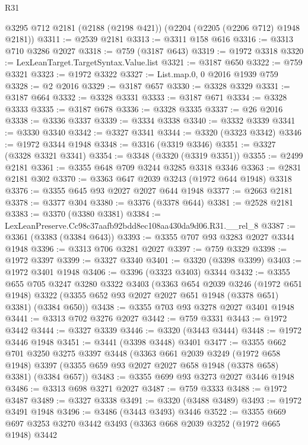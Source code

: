 \begin{lexlean}{R31}
\begin{coremodule}
    @3295
    @712
    @2181
    (@2188 (@2198 @421))
    (@2204 (@2205 (@2206 @712) @1948 @2181))
@3311 := @2539 @2181
@3313 := @3311 @158 @616
@3316 := @3313 @710 @3286 @2027
@3318 := @759 (@3187 @643)
@3319 := @1972 @3318
@3320 := LexLeanTarget.TargetSyntax.Value.list
@3321 := @3187 @650
@3322 := @759 @3321
@3323 := @1972 @3322
@3327 := List.map.{0, 0} @2016 @1939 @759
@3328 := @2 @2016
@3329 := @3187 @657
@3330 := @3328 @3329
@3331 := @3187 @664
@3332 := @3328 @3331
@3333 := @3187 @671
@3334 := @3328 @3333
@3335 := @3187 @678
@3336 := @3328 @3335
@3337 := @26 @2016
@3338 := @3336 @3337
@3339 := @3334 @3338
@3340 := @3332 @3339
@3341 := @3330 @3340
@3342 := @3327 @3341
@3344 := @3320 (@3323 @3342)
@3346 := @1972 @3344 @1948
@3348 := @3316 (@3319 @3346)
@3351 := @3327 (@3328 @3321 @3341)
@3354 := @3348 (@3320 (@3319 @3351))
@3355 := @2499 @2181
@3361 := @3355 @648 @709 @3244 @3285 @3318 @3346
@3363 := @2831 @2181 @302
@3370 := @3363 @647 @2039 @3243 (@1972 @644 @1948) @3318
@3376 := @3355 @645 @93 @2027 @2027 @644 @1948
@3377 := @2663 @2181
@3378 := @3377 @304
@3380 := @3376 (@3378 @644)
@3381 := @2528 @2181
@3383 := @3370 (@3380 @3381)
@3384 := LexLeanPreserve.Cc98c37aafb92bdd8ec108aa430da9d06.R31.__rel_8
@3387 := @3361 (@3383 (@3384 @643))
@3393 := @3355 @707 @93 @3283 @2027 @3344 @1948
@3396 := @3313 @706 @3281 @2027
@3397 := @759 @3329
@3398 := @1972 @3397
@3399 := @3327 @3340
@3401 := @3320 (@3398 @3399)
@3403 := @1972 @3401 @1948
@3406 := @3396 (@3323 @3403) @3344
@3432 := @3355
    @655
    @705
    @3247
    @3280
    @3322
    @3403
    (@3363
      @654
      @2039
      @3246
      (@1972 @651 @1948)
      @3322
      (@3355 @652 @93 @2027 @2027 @651 @1948 (@3378 @651) @3381)
      (@3384 @650))
@3438 := @3355 @703 @93 @3278 @2027 @3401 @1948
@3441 := @3313 @702 @3276 @2027
@3442 := @759 @3331
@3443 := @1972 @3442
@3444 := @3327 @3339
@3446 := @3320 (@3443 @3444)
@3448 := @1972 @3446 @1948
@3451 := @3441 (@3398 @3448) @3401
@3477 := @3355
    @662
    @701
    @3250
    @3275
    @3397
    @3448
    (@3363
      @661
      @2039
      @3249
      (@1972 @658 @1948)
      @3397
      (@3355 @659 @93 @2027 @2027 @658 @1948 (@3378 @658) @3381)
      (@3384 @657))
@3483 := @3355 @699 @93 @3273 @2027 @3446 @1948
@3486 := @3313 @698 @3271 @2027
@3487 := @759 @3333
@3488 := @1972 @3487
@3489 := @3327 @3338
@3491 := @3320 (@3488 @3489)
@3493 := @1972 @3491 @1948
@3496 := @3486 (@3443 @3493) @3446
@3522 := @3355
    @669
    @697
    @3253
    @3270
    @3442
    @3493
    (@3363
      @668
      @2039
      @3252
      (@1972 @665 @1948)
      @3442

\end{coremodule}
\end{lexlean}
